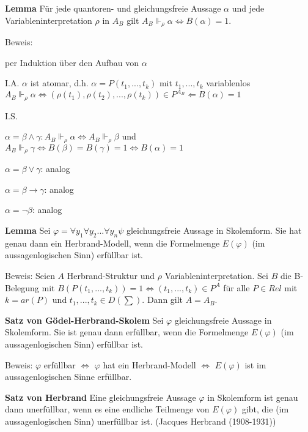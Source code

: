 \documentclass[a4paper]{article}
\renewcommand{\note}[2]{\begin{noteBox} \textbf{#1} #2 \end{noteBox}}
\begin{document}
\begin{multicols}{3}
  \note{Lemma}{Für jede quantoren- und gleichungsfreie Aussage $\alpha$ und jede Variableninterpretation $\rho$ in $A_B$ gilt $A_B\Vdash_\rho\alpha \Leftrightarrow B(\alpha)= 1$.}

  Beweis:
  \begin{itemize*}
    \item per Induktion über den Aufbau von $\alpha$
    \item I.A. $\alpha$ ist atomar, d.h. $\alpha= P(t_1,...,t_k)$ mit $t_1,...,t_k$ variablenlos $A_B\Vdash_\rho \alpha\Leftrightarrow (\rho(t_1),\rho(t_2),...,\rho(t_k))\in P^{A_B}\Leftarrow B(\alpha)= 1$
    \item I.S.
    \begin{itemize*}
      \item $\alpha=\beta\wedge\gamma: A_B\Vdash_\rho \alpha\Leftrightarrow A_B \Vdash_\rho\beta$ und $A_B\Vdash_\rho\gamma \Leftrightarrow B(\beta)=B(\gamma)= 1 \Leftrightarrow B(\alpha)= 1$
      \item $\alpha=\beta\vee\gamma$: analog
      \item $\alpha=\beta\rightarrow\gamma$: analog
      \item $\alpha=\lnot\beta$: analog
    \end{itemize*}
  \end{itemize*}

  \note{Lemma}{Sei $\varphi=\forall y_1 \forall y_2 ...\forall y_n\psi$ gleichungsfreie Aussage in Skolemform. Sie hat genau dann ein Herbrand-Modell, wenn die Formelmenge $E(\varphi)$ (im aussagenlogischen Sinn) erfüllbar ist.}

  Beweis: Seien $A$ Herbrand-Struktur und $\rho$ Variableninterpretation. Sei $B$ die B-Belegung mit $B(P(t_1,...,t_k))= 1\Leftrightarrow(t_1,...,t_k)\in P^A$ für alle $P\in Rel$ mit $k=ar(P)$ und $t_1,...,t_k\in D(\sum)$. Dann gilt $A=A_B$.

  \note{Satz von Gödel-Herbrand-Skolem}{Sei $\varphi$ gleichungsfreie Aussage in Skolemform. Sie ist genau dann erfüllbar, wenn die Formelmenge $E(\varphi)$ (im aussagenlogischen Sinn) erfüllbar ist.}

  Beweis: $\varphi$ erfüllbar $\Leftrightarrow$ $\varphi$  hat ein Herbrand-Modell $\Leftrightarrow$  $E(\varphi)$ ist im aussagenlogischen Sinne erfüllbar.

  \note{Satz von Herbrand}{Eine gleichungsfreie Aussage $\varphi$ in Skolemform ist genau dann unerfüllbar, wenn es eine endliche Teilmenge von $E(\varphi)$ gibt, die (im aussagenlogischen Sinn) unerfüllbar ist. (Jacques Herbrand (1908-1931))}


\end{multicols}
\end{document}
